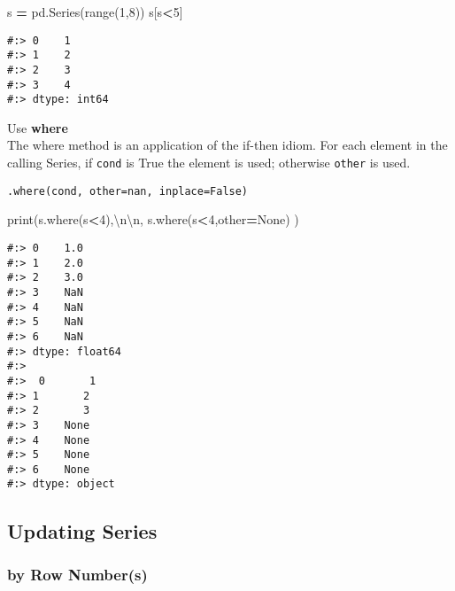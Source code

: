 \documentclass[
]{book}
\newenvironment{Shaded}{\begin{snugshade}}{\end{snugshade}}
\newcommand{\BuiltInTok}[1]{#1}
\newcommand{\CharTok}[1]{\textcolor[rgb]{0.5,0.5,0.5}{#1}}
\newcommand{\DecValTok}[1]{\textcolor[rgb]{0.06,0.06,0.06}{#1}}
\newcommand{\NormalTok}[1]{#1}
\newcommand{\OperatorTok}[1]{\textcolor[rgb]{0.43,0.43,0.43}{\textbf{#1}}}
\newcommand{\StringTok}[1]{\textcolor[rgb]{0.5,0.5,0.5}{#1}}
\newcommand{\VariableTok}[1]{\textcolor[rgb]{0,0,0}{#1}}
\begin{document}
\begin{Shaded}
\begin{Highlighting}[]
\NormalTok{s }\OperatorTok{=}\NormalTok{ pd.Series(}\BuiltInTok{range}\NormalTok{(}\DecValTok{1}\NormalTok{,}\DecValTok{8}\NormalTok{))}
\NormalTok{s[s}\OperatorTok{\textless{}}\DecValTok{5}\NormalTok{]}
\end{Highlighting}
\end{Shaded}

\begin{verbatim}
#:> 0    1
#:> 1    2
#:> 2    3
#:> 3    4
#:> dtype: int64
\end{verbatim}

Use \textbf{where}\\
The where method is an application of the if-then idiom. For each element in the calling Series, if \texttt{cond} is True the element is used; otherwise \texttt{other} is used.

\begin{verbatim}
.where(cond, other=nan, inplace=False)
\end{verbatim}

\begin{Shaded}
\begin{Highlighting}[]
\BuiltInTok{print}\NormalTok{(s.where(s}\OperatorTok{\textless{}}\DecValTok{4}\NormalTok{),}\StringTok{\textquotesingle{}}\CharTok{\textbackslash{}n\textbackslash{}n}\StringTok{\textquotesingle{}}\NormalTok{,}
\NormalTok{      s.where(s}\OperatorTok{\textless{}}\DecValTok{4}\NormalTok{,other}\OperatorTok{=}\VariableTok{None}\NormalTok{) )}
\end{Highlighting}
\end{Shaded}

\begin{verbatim}
#:> 0    1.0
#:> 1    2.0
#:> 2    3.0
#:> 3    NaN
#:> 4    NaN
#:> 5    NaN
#:> 6    NaN
#:> dtype: float64 
#:> 
#:>  0       1
#:> 1       2
#:> 2       3
#:> 3    None
#:> 4    None
#:> 5    None
#:> 6    None
#:> dtype: object
\end{verbatim}

\hypertarget{updating-series}{%
\subsection{Updating Series}\label{updating-series}}

\hypertarget{by-row-numbers-1}{%
\subsubsection{by Row Number(s)}\label{by-row-numbers-1}}
\end{document}
